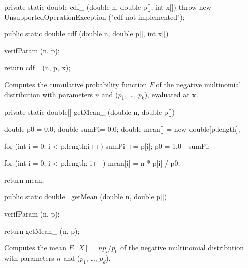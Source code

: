 \begin{code}\begin{hide}

   private static double cdf_ (double n, double p[], int x[]) {
      throw new UnsupportedOperationException ("cdf not implemented");
   }\end{hide}

   public static double cdf (double n, double p[], int x[])\begin{hide} {
      verifParam (n, p);

      return cdf_ (n, p, x);
   }\end{hide}
\end{code}
\begin{tabb}
   Computes the cumulative probability function $F$ of the
   negative multinomial distribution with parameters $n$
   and ($p_1$, \ldots, $p_k$), evaluated at $\mathbf{x}$.
\end{tabb}
\begin{code}\begin{hide}

   private static double[] getMean_ (double n, double p[]) {
      double p0 = 0.0;
      double sumPi= 0.0;
      double mean[] = new double[p.length];

      for (int i = 0; i < p.length;i++)
         sumPi += p[i];
      p0 = 1.0 - sumPi;

      for (int i = 0; i < p.length; i++)
         mean[i] = n * p[i] / p0;

      return mean;
   }\end{hide}

   public static double[] getMean (double n, double p[])\begin{hide} {
      verifParam (n, p);

      return getMean_ (n, p);
   }\end{hide}
\end{code}
\begin{tabb}
   Computes the mean $E[X] = n p_i / p_0$ of the negative multinomial distribution
   with parameters $n$ and ($p_1$, \ldots, $p_d$).
\end{tabb}
